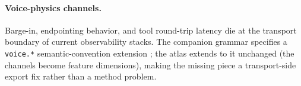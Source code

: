 \paragraph{Voice-physics channels.}
Barge-in, endpointing behavior, and tool round-trip latency die at the transport boundary of
current observability stacks.
The companion grammar specifies a \texttt{voice.*} semantic-convention extension
\citep{garcia2026grammar}; the atlas extends to it unchanged (the channels become feature
dimensions), making the missing piece a transport-side export fix rather than a method
problem.
